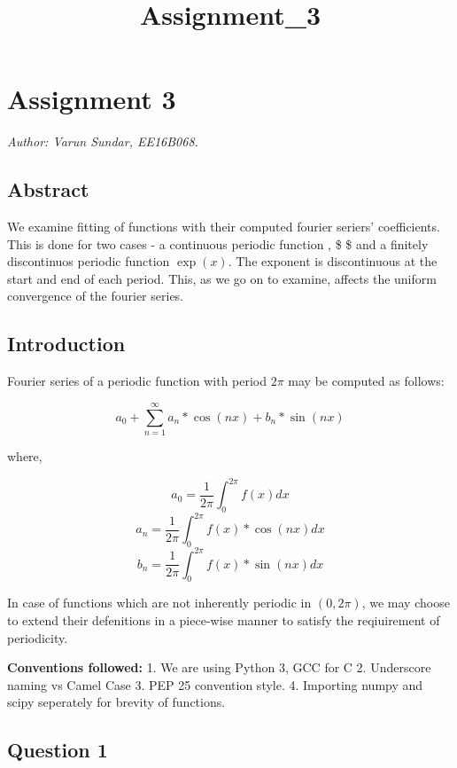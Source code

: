 \documentclass[11pt]{article}
\title{Assignment\_3}
\begin{document}
    
    
    \maketitle
    
    

    
    \hypertarget{assignment-3}{%
\section{Assignment 3}\label{assignment-3}}

\emph{Author: Varun Sundar, EE16B068.}

\hypertarget{abstract}{%
\subsection{Abstract}\label{abstract}}

We examine fitting of functions with their computed fourier seriers'
coefficients. This is done for two cases - a continuous periodic
function , \$ \$ and a finitely discontinuos periodic
function \(\exp(x)\). The exponent is discontinuous at the start and end
of each period. This, as we go on to examine, affects the uniform
convergence of the fourier series.

\hypertarget{introduction}{%
\subsection{Introduction}\label{introduction}}

Fourier series of a periodic function with period \(2\pi\) may be
computed as follows:

\[ a_0 + \sum_{n=1}^{\infty} {a_n*\cos(nx) + b_n*\sin(nx)} \]

where,

\[a_0 = \frac{1}{2\pi} \int_0^{2\pi}f(x)dx\]
\[a_n = \frac{1}{2\pi} \int_0^{2\pi}f(x)*\cos(nx)dx\]
\[b_n = \frac{1}{2\pi} \int_0^{2\pi}f(x)*\sin(nx)dx\]

In case of functions which are not inherently periodic in \((0,2\pi)\),
we may choose to extend their defenitions in a piece-wise manner to
satisfy the reqiuirement of periodicity.

\textbf{Conventions followed:} 1. We are using Python 3, GCC for C 2.
Underscore naming vs Camel Case 3. PEP 25 convention style. 4. Importing
numpy and scipy seperately for brevity of functions.

\hypertarget{question-1}{%
\subsection{Question 1}\label{question-1}}
\end{document}
